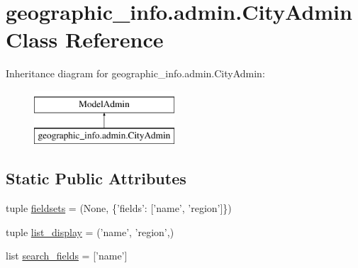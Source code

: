 \hypertarget{classgeographic__info_1_1admin_1_1_city_admin}{\section{geographic\-\_\-info.\-admin.\-City\-Admin Class Reference}
\label{classgeographic__info_1_1admin_1_1_city_admin}
}
Inheritance diagram for geographic\-\_\-info.\-admin.\-City\-Admin\-:\begin{figure}[H]
\begin{center}
\leavevmode
\includegraphics[height=2.000000cm]{classgeographic__info_1_1admin_1_1_city_admin}
\end{center}
\end{figure}
\subsection*{Static Public Attributes}
\begin{DoxyCompactItemize}
\item 
tuple \hyperlink{classgeographic__info_1_1admin_1_1_city_admin_a668f77bd45d98e780aa452b11956245e}{fieldsets} = (None, \{'fields'\-: \mbox{[}'name', 'region'\mbox{]}\})
\item 
tuple \hyperlink{classgeographic__info_1_1admin_1_1_city_admin_aa215029b4541eb0453beca4c746929c5}{list\-\_\-display} = ('name', 'region',)
\item 
list \hyperlink{classgeographic__info_1_1admin_1_1_city_admin_a1119d364f8da70f4c2540a8868ad492b}{search\-\_\-fields} = \mbox{[}'name'\mbox{]}
\end{DoxyCompactItemize}


